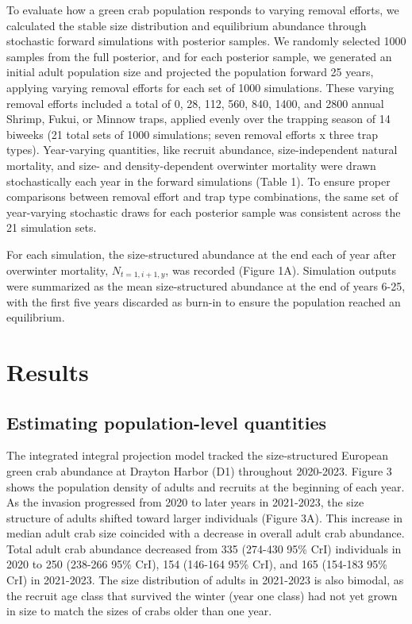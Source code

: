 \documentclass{article}
\begin{document}
To evaluate how a green crab population responds to varying removal efforts, we calculated the stable size distribution and equilibrium abundance through stochastic forward simulations with posterior samples. We randomly selected 1000 samples from the full posterior, and for each posterior sample, we generated an initial adult population size and projected the population forward 25 years, applying varying removal efforts for each set of 1000 simulations. These varying removal efforts included a total of 0, 28, 112, 560, 840, 1400, and 2800 annual Shrimp, Fukui, or Minnow traps, applied evenly over the trapping season of 14 biweeks (21 total sets of 1000 simulations; seven removal efforts x three trap types). Year-varying quantities, like recruit abundance, size-independent natural mortality, and size- and density-dependent overwinter mortality were drawn stochastically each year in the forward simulations (Table 1). To ensure proper comparisons between removal effort and trap type combinations, the same set of year-varying stochastic draws for each posterior sample was consistent across the 21 simulation sets. 

For each simulation, the size-structured abundance at the end each of year after overwinter mortality, $N_{t=1,i+1,y}$, was recorded (Figure 1A). Simulation outputs were summarized as the mean size-structured abundance at the end of years 6-25, with the first five years discarded as burn-in to ensure the population reached an equilibrium.

\section{Results}

\subsection{Estimating population-level quantities}

The integrated integral projection model tracked the size-structured European green crab abundance at Drayton Harbor (D1) throughout 2020-2023. Figure 3 shows the population density of adults and recruits at the beginning of each year. As the invasion progressed from 2020 to later years in 2021-2023, the size structure of adults shifted toward larger individuals (Figure 3A). This increase in median adult crab size coincided with a decrease in overall adult crab abundance. Total adult crab abundance decreased from 335 (274-430 95\% CrI) individuals in 2020 to 250 (238-266 95\% CrI), 154 (146-164 95\% CrI), and 165 (154-183 95\% CrI) in 2021-2023. The size distribution of adults in 2021-2023 is also bimodal, as the recruit age class that survived the winter (year one class) had not yet grown in size to match the sizes of crabs older than one year.
\end{document}

